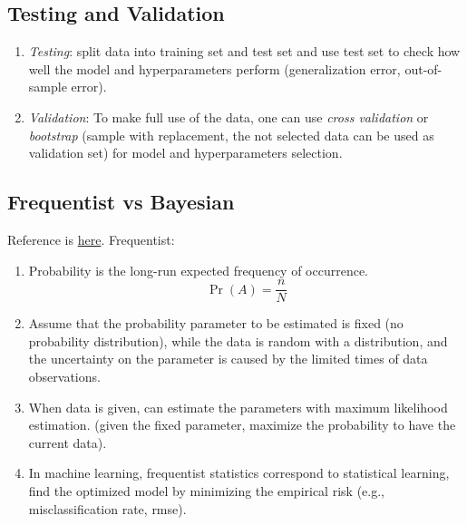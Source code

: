 \documentclass[12pt,oneside,a4paper]{article}
\numberwithin{equation}{section}
\begin{document}
\subsection{Testing and Validation}
\begin{enumerate}
\item \emph{Testing}: split data into training set and test set and use test set to check how well the model and hyperparameters perform (generalization error, out-of-sample error). 

\item \emph{Validation}: To make full use of the data, one can use \emph{cross validation} or \emph{bootstrap} (sample with replacement, the not selected data can be used as validation set) for model and hyperparameters selection.
\end{enumerate}

\subsection{Frequentist vs Bayesian}
Reference is \href{http://www.statisticalengineering.com/frequentists_and_bayesians.htm}{here}.
Frequentist:
\begin{enumerate}
\item Probability is the long-run expected frequency of occurrence. 
\begin{equation}
\Pr (A) = \frac{n}{N}
\end{equation}

\item Assume that the probability parameter to be estimated is fixed (no probability distribution), while the data is random with a distribution, and the uncertainty on the parameter is caused by the limited times of data observations.

\item When data is given, can estimate the parameters with maximum likelihood estimation. (given the fixed parameter, maximize the probability to have the current data).

\item In machine learning, frequentist statistics correspond to statistical learning, find the optimized model by minimizing the empirical risk (e.g., misclassification rate, rmse).
\end{enumerate}
\end{document}
